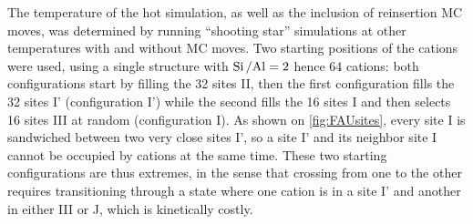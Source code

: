 \documentclass[main.tex]{subfiles}
\begin{document}
The temperature of the hot simulation, as well as the inclusion of reinsertion MC moves, was determined by running ``shooting star'' simulations at other temperatures with and without MC moves. Two starting positions of the cations were used, using a single structure with $\mbox{Si\,/Al} = 2$ hence 64 cations: both configurations start by filling the 32 sites II, then the first configuration fills the 32 sites I' (configuration I') while the second fills the 16 sites I and then selects 16 sites III at random (configuration I). As shown on \cref{fig:FAUsites}, every site I is sandwiched between two very close sites I', so a site I' and its neighbor site I cannot be occupied by cations at the same time. These two starting configurations are thus extremes, in the sense that crossing from one to the other requires transitioning through a state where one cation is in a site I' and another in either III or J, which is kinetically costly.
\end{document}
